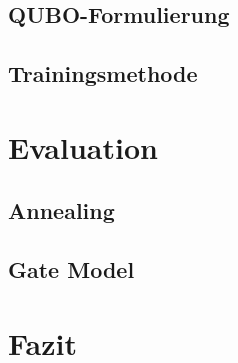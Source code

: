 \subsection{QUBO-Formulierung}
\label{subsec:qubo}


\subsection{Trainingsmethode}
\label{subsec:training}


\section{Evaluation}
\label{sec:evaluation}


\subsection{Annealing}
\label{subsec:annealing}


\subsection{Gate Model}
\label{subsec:qgm}


\section{Fazit}
\label{sec:conclusion}


